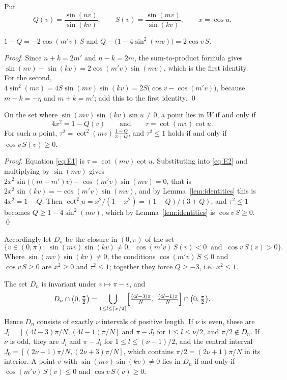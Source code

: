 Put
\[
Q(v)=\frac{\sin(nv)}{\sin(kv)},\qquad S(v)=\frac{\sin(mv)}{\sin(kv)},\qquad x=\cos u .
\]

\begin{lemma}\label{lem:identities}
$1-Q=-2\cos(m'v)\,S$ and $Q-\bigl(1-4\sin^2(mv)\bigr)=2\cos v\,S$.
\end{lemma}

\begin{proof}
Since $n+k=2m'$ and $n-k=2m$, the sum-to-product formula gives $\sin(nv)-\sin(kv)=2\cos(m'v)\sin(mv)$,
which is the first identity. For the second, $4\sin^2(mv)=4S\sin(mv)\sin(kv)=2S\bigl(\cos v-\cos(m'v)\bigr)$,
because $m-k=-\eta$ and $m+k=m'$; add this to the first identity. \qed
\end{proof}

\begin{lemma}[Elimination]\label{lem:elim}
On the set where $\sin(mv)\sin(kv)\sin u\neq0$, a point lies in $W$ if and only if
\[
4x^2=1-Q(v)\qquad\text{and}\qquad\tau=\cot(mv)\cot u .
\]
For such a point, $\tau^2=\cot^2(mv)\,\frac{1-Q}{3+Q}$, and $\tau^2\le1$ holds if and only if $\cos v\,S(v)\ge0$.
\end{lemma}

\begin{proof}
Equation \eqref{eq:E1} is $\tau=\cot(mv)\cot u$. Substituting into \eqref{eq:E2} and multiplying by $\sin(mv)$ gives
$2x^2\sin\bigl((m-m')v\bigr)-\cos(m'v)\sin(mv)=0$, that is $2x^2\sin(kv)=-\cos(m'v)\sin(mv)$, and by
Lemma~\ref{lem:identities} this is $4x^2=1-Q$. Then $\cot^2u=x^2/(1-x^2)=(1-Q)/(3+Q)$, and
$\tau^2\le1$ becomes $Q\ge1-4\sin^2(mv)$, which by Lemma~\ref{lem:identities} is $\cos v\,S\ge0$. \qed
\end{proof}

Accordingly let $D_n$ be the closure in $(0,\pi)$ of the set
\[
\bigl\{v\in(0,\pi):\ \sin(mv)\sin(kv)\neq0,\ \ \cos(m'v)\,S(v)<0\ \text{ and }\ \cos v\,S(v)>0\bigr\}.
\]
Where $\sin(mv)\sin(kv)\neq0$, the conditions $\cos(m'v)\,S\le0$ and $\cos v\,S\ge0$ are $x^2\ge0$ and $\tau^2\le1$; together
they force $Q\ge-3$, i.e.\ $x^2\le1$.

\begin{proposition}\label{prop:domain}
The set $D_n$ is invariant under $v\mapsto\pi-v$, and
\[
D_n\cap\bigl(0,\tfrac\pi2\bigr)=\bigcup_{1\le l\le\lceil\nu/2\rceil}\Bigl[\tfrac{(4l-3)\pi}N,\ \tfrac{(4l-1)\pi}N\Bigr]\cap\bigl(0,\tfrac\pi2\bigr).
\]
Hence $D_n$ consists of exactly $\nu$ intervals of positive length. If $\nu$ is even, these are
$J_l=[(4l-3)\pi/N,(4l-1)\pi/N]$ and $\pi-J_l$ for $1\le l\le\nu/2$, and $\pi/2\notin D_n$. If $\nu$ is odd, they
are $J_l$ and $\pi-J_l$ for $1\le l\le(\nu-1)/2$, and the central interval $J_0=[(2\nu-1)\pi/N,(2\nu+3)\pi/N]$,
which contains $\pi/2=(2\nu+1)\pi/N$ in its interior. A point $v$ with $\sin(mv)\sin(kv)\neq0$ lies in $D_n$ if and only if
$\cos(m'v)\,S(v)\le0$ and $\cos v\,S(v)\ge0$.
\end{proposition}

